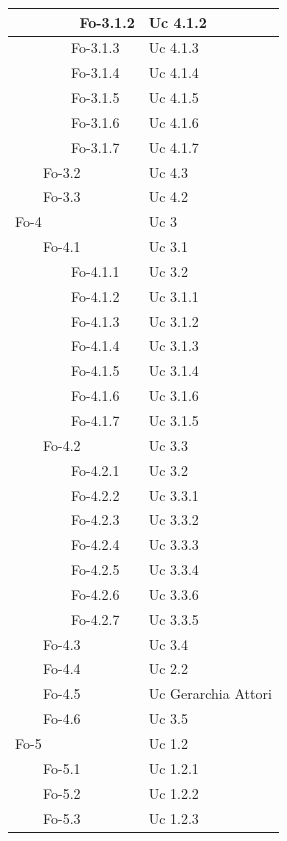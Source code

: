 \documentclass[10pt,a4paper]{article}
\begin{document}
\begin{longtable}{|p{5cm}|p{5cm}|}
\hline
\ \ \ \ \ \ \ \ Fo-3.1.2 & Uc 4.1.2\\
\hline
\ \ \ \ \ \ \ \ Fo-3.1.3 & Uc 4.1.3\\
\hline
\ \ \ \ \ \ \ \ Fo-3.1.4 & Uc 4.1.4\\
\hline
\ \ \ \ \ \ \ \ Fo-3.1.5 & Uc 4.1.5\\
\hline
\ \ \ \ \ \ \ \ Fo-3.1.6 & Uc 4.1.6\\
\hline
\ \ \ \ \ \ \ \ Fo-3.1.7 & Uc 4.1.7\\
\hline
\ \ \ \ Fo-3.2 & Uc 4.3\\
\hline
\ \ \ \ Fo-3.3 & Uc 4.2\\
\hline
Fo-4 & Uc 3\\
\hline
\ \ \ \ Fo-4.1 & Uc 3.1\\
\hline
\ \ \ \ \ \ \ \ Fo-4.1.1 & Uc 3.2\\
\hline
\ \ \ \ \ \ \ \ Fo-4.1.2 & Uc 3.1.1\\
\hline
\ \ \ \ \ \ \ \ Fo-4.1.3 & Uc 3.1.2\\
\hline
\ \ \ \ \ \ \ \ Fo-4.1.4 & Uc 3.1.3\\
\hline
\ \ \ \ \ \ \ \ Fo-4.1.5 & Uc 3.1.4\\
\hline
\ \ \ \ \ \ \ \ Fo-4.1.6 & Uc 3.1.6\\
\hline
\ \ \ \ \ \ \ \ Fo-4.1.7 & Uc 3.1.5\\
\hline
\ \ \ \ Fo-4.2 & Uc 3.3\\
\hline
\ \ \ \ \ \ \ \ Fo-4.2.1 & Uc 3.2\\
\hline
\ \ \ \ \ \ \ \ Fo-4.2.2 & Uc 3.3.1\\
\hline
\ \ \ \ \ \ \ \ Fo-4.2.3 & Uc 3.3.2\\
\hline
\ \ \ \ \ \ \ \ Fo-4.2.4 & Uc 3.3.3\\
\hline
\ \ \ \ \ \ \ \ Fo-4.2.5 & Uc 3.3.4\\
\hline
\ \ \ \ \ \ \ \ Fo-4.2.6 & Uc 3.3.6\\
\hline
\ \ \ \ \ \ \ \ Fo-4.2.7 & Uc 3.3.5\\
\hline
\ \ \ \ Fo-4.3 & Uc 3.4\\
\hline
\ \ \ \ Fo-4.4 & Uc 2.2\\
\hline
\ \ \ \ Fo-4.5 & Uc Gerarchia Attori\\
\hline
\ \ \ \ Fo-4.6 & Uc 3.5\\
\hline
Fo-5 & Uc 1.2\\
\hline
\ \ \ \ Fo-5.1 & Uc 1.2.1\\
\hline
\ \ \ \ Fo-5.2 & Uc 1.2.2\\
\hline
\ \ \ \ Fo-5.3 & Uc 1.2.3\\

\end{longtable}
\end{document}
